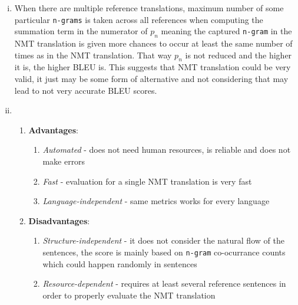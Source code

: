 \begin{parts}
{\begin{enumerate}[i.]
    \item When there are multiple reference translations, maximum number of some particular \texttt{n-grams} is taken across all references when computing the summation term in the numerator of $p_n$ meaning the captured \texttt{n-gram} in the NMT translation is given more chances to occur at least the same number of times as in the NMT translation. That way $p_n$ is not reduced and the higher it is, the higher BLEU is. This suggests that NMT translation could be very valid, it just may be some form of alternative and not considering that may lead to not very accurate BLEU scores.
    
    \item \begin{enumerate}
        \item \textbf{Advantages}:
            \begin{enumerate}
                \item \textit{Automated} - does not need human resources, is reliable and does not make errors
                \item \textit{Fast} - evaluation for a single NMT translation is very fast
                \item \textit{Language-independent} - same metrics works for every language
            \end{enumerate}
        \item \textbf{Disadvantages}:
            \begin{enumerate}
                \item \textit{Structure-independent} - it does not consider the natural flow of the sentences, the score is mainly based on \texttt{n-gram} co-ocurrance counts which could happen randomly in sentences
                \item \textit{Resource-dependent} - requires at least several reference sentences in order to properly evaluate the NMT translation
            \end{enumerate}
    \end{enumerate}
    \end{enumerate}
    }
\end{parts}
